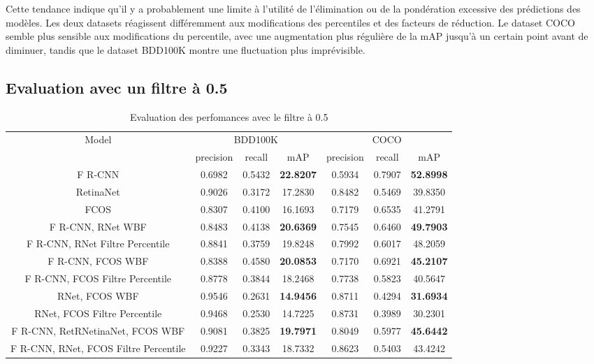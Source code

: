 \documentclass{article}
\begin{document}
Cette tendance indique qu'il y a probablement une limite à l'utilité de l'élimination ou de la pondération excessive des prédictions des modèles.
Les deux datasets réagissent différemment aux modifications des percentiles et des facteurs de réduction.
Le dataset COCO semble plus sensible aux modifications du percentile, avec une augmentation plus régulière de la mAP jusqu'à un certain point avant de diminuer, tandis que le dataset BDD100K montre une fluctuation plus imprévisible.


\subsection{Evaluation avec un filtre à 0.5}

\begin{table}[h!]
\centering
\begin{tabular}{|c||c|c|c||c|c|c|} 
\hline
Model & \multicolumn{3}{|c||}{BDD100K} & \multicolumn{3}{|c|}{COCO} \\ 
 & precision & recall & mAP  & precision & recall & mAP  \\ [0.5ex] 
\hline
F R-CNN & 0.6982 & 0.5432 & \textbf{22.8207} & 0.5934 & 0.7907 & \textbf{52.8998} \\ 
\hline
RetinaNet & 0.9026 & 0.3172 & 17.2830 & 0.8482 & 0.5469 & 39.8350 \\ 
\hline
FCOS & 0.8307 & 0.4100 & 16.1693 & 0.7179 & 0.6535 & 41.2791 \\ 
\hline
F R-CNN, RNet WBF & 0.8483 & 0.4138 & \textbf{20.6369} & 0.7545 & 0.6460 & \textbf{49.7903} \\ 
\hline
F R-CNN, RNet Filtre Percentile & 0.8841 & 0.3759 & 19.8248 & 0.7992 & 0.6017 & 48.2059 \\ 
\hline
F R-CNN, FCOS WBF & 0.8388 & 0.4580 & \textbf{20.0853} & 0.7170 & 0.6921 & \textbf{45.2107} \\ 
\hline
F R-CNN, FCOS Filtre Percentile & 0.8778 & 0.3844 & 18.2468 & 0.7738 & 0.5823 & 40.5647 \\ 
\hline
RNet, FCOS WBF & 0.9546 & 0.2631 & \textbf{14.9456} & 0.8711 & 0.4294 & \textbf{31.6934} \\ 
\hline
RNet, FCOS Filtre Percentile & 0.9468 & 0.2530 & 14.7225 & 0.8731 & 0.3989 & 30.2301 \\ 
\hline
F R-CNN, RetRNetinaNet, FCOS WBF & 0.9081 & 0.3825 & \textbf{19.7971} & 0.8049 & 0.5977 & \textbf{45.6442} \\ 
\hline
F R-CNN, RNet, FCOS Filtre Percentile & 0.9227 & 0.3343 & 18.7332 & 0.8623 & 0.5403 & 43.4242 \\ 
\hline
\end{tabular}
\caption{Evaluation des perfomances avec le filtre à 0.5 }
\label{table:data}
\end{table}
\end{document}
